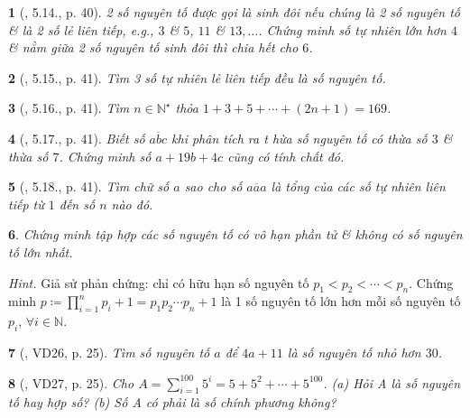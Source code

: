 \documentclass{article}
\newtheorem{baitoan}{}
\begin{document}
\begin{baitoan}[\cite{Binh_boi_duong_Toan_6_tap_1}, 5.14., p. 40]
	2 số nguyên tố được gọi là {\rm sinh đôi} nếu chúng là 2 số nguyên tố \& là 2 số lẻ liên tiếp, e.g., $3$ \& $5$, $11$ \& $13,\ldots$. Chứng minh số tự nhiên lớn hơn $4$ \& nằm giữa 2 số nguyên tố sinh đôi thì chia hết cho $6$.
\end{baitoan}

\begin{baitoan}[\cite{Binh_boi_duong_Toan_6_tap_1}, 5.15., p. 41]
	Tìm 3 số tự nhiên lẻ liên tiếp đều là số nguyên tố.
\end{baitoan}

\begin{baitoan}[\cite{Binh_boi_duong_Toan_6_tap_1}, 5.16., p. 41]
	Tìm $n\in\mathbb{N}^\star$ thỏa $1 + 3 + 5 + \cdots + (2n + 1) = 169$.
\end{baitoan}

\begin{baitoan}[\cite{Binh_boi_duong_Toan_6_tap_1}, 5.17., p. 41]
	Biết số $\overline{abc}$ khi phân tích ra t hừa số nguyên tố có thừa số $3$ \& thừa số $7$. Chứng minh số $a + 19b + 4c$ cũng có tính chất đó.
\end{baitoan}

\begin{baitoan}[\cite{Binh_boi_duong_Toan_6_tap_1}, 5.18., p. 41]
	Tìm chữ số $a$ sao cho số $\overline{aaa}$ là tổng của các số tự nhiên liên tiếp từ $1$ đến số $n$ nào đó.
\end{baitoan}

\begin{baitoan}
	Chứng minh tập hợp các số nguyên tố có vô hạn phần tử \& không có số nguyên tố lớn nhất.
\end{baitoan}
\noindent\textit{Hint.} Giả sử phản chứng: chỉ có hữu hạn số nguyên tố $p_1 < p_2 < \cdots < p_n$. Chứng minh $p\coloneqq\prod_{i=1}^n p_i + 1 = p_1p_2\cdots p_n + 1$ là 1 số nguyên tố lớn hơn mỗi số nguyên tố $p_i$, $\forall i\in\mathbb{N}$.

\begin{baitoan}[\cite{Tuyen_Toan_6}, VD26, p. 25]
	Tìm số nguyên tố $a$ để $4a + 11$ là số nguyên tố nhỏ hơn $30$.
\end{baitoan}

\begin{baitoan}[\cite{Tuyen_Toan_6}, VD27, p. 25]
	Cho $A = \sum_{i=1}^{100} 5^i = 5 + 5^2 + \cdots + 5^{100}$. (a) Hỏi A là số nguyên tố hay hợp số? (b) Số A có phải là số chính phương không?
\end{baitoan}
\end{document}
